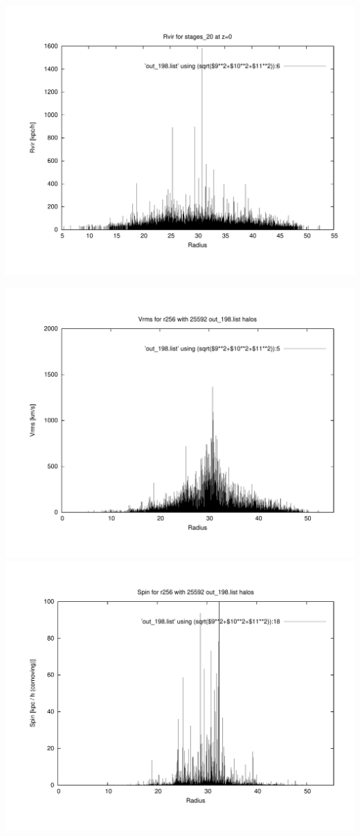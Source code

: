 \includegraphics[scale=0.3]{r256/h100/stages_20/plot_rvir_z0.pdf}

\includegraphics[scale=0.3]{r256/h100/stages_20/plot_Vrms_out_198.pdf}
\includegraphics[scale=0.3]{r256/h100/stages_20/plot_spin_out_198.pdf}

